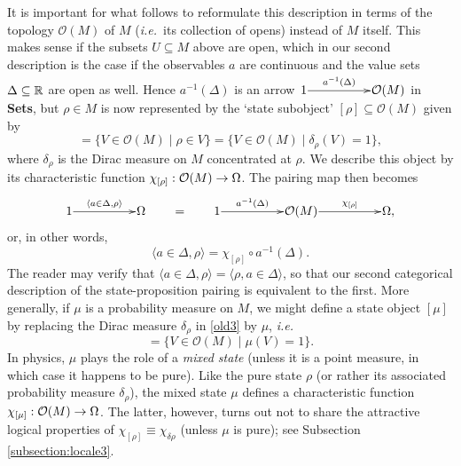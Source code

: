 \documentclass[12pt]{article}
\newcommand{\beq}{\begin{equation}}
\newcommand{\eeq}{\end{equation}}
\newcommand{\Sets}{\mbox{\textbf{Sets}}}
\newcommand{\raw}{\rightarrow} \newcommand{\rat}{\mapsto}
\newcommand{\inv}{^{-1}}
\newcommand{\er}{\eqref}
\newcommand{\dl}{\delta} \newcommand{\Dl}{\Delta}
\newcommand{\rh}{\rho} \newcommand{\sg}{\sigma}
\newcommand{\ch}{\chi} \newcommand{\ps}{\psi} \newcommand{\Ps}{\Psi}
\newcommand{\CO}{{\mathcal O}} \newcommand{\CP}{{\mathcal P}}
\newcommand{\ie}{\textit{i.e.}}
\begin{document}
It is important for what follows to reformulate this description in terms of
the topology $\CO(M)$ of $M$ (\ie\ its collection of opens) instead of $M$ itself.  This makes sense if the subsets $U\subseteq M$ above are open, which in our second description is the case if the observables $a$ are continuous and the value sets $\Dl\subseteq\R$ are open as well.  Hence $a\inv(\Dl)$ is an arrow
$\xymatrix@1{1\ar^-{a^{-1}(\Dl)}[rr] && \CO(M)}$ in \Sets, but $\rho\in M$ is now
represented by the `state subobject' \hbox{$[\rho]\subseteq\CO(M)$} given by
\beq
   [\rho]=\{V\in\CO(M)\mid \rho\in V\} =\{V\in\CO(M)\mid \dl_{\rho}(V)=1\},
   \label{old3}
\eeq
where $\dl_{\rho}$ is the Dirac measure on $M$ concentrated at $\rho$.
We describe this object by its characteristic function
$\ch_{[\rho]}:\CO(M)\raw\Om$. The pairing map then becomes
\beq
   \xymatrix@1{1\ar^-{\langle a\in \Dl,\rho \rangle}[rr]&&\Om}
   \qquad =\qquad
   \xymatrix@1{1\ar^-{a^{-1}(\Dl)}[rr] && \CO(M)
   \ar^-{\chi_{[\rho]}}[rr]&&\Om,} \label{spp}
\eeq
or, in other words,
\beq
\langle a\in \Dl,\rho \rangle=\chi_{[\rho]}\circ a^{-1}(\Dl).\label{circainv}\eeq
The reader may verify that $\langle a\in \Dl,\rho \rangle=\langle
\rho,a\in \Dl \rangle$, so that our second categorical description of the
state-proposition pairing is equivalent to the first. More generally, if $\mu$ is a probability measure on $M$, we might define a state object $[\mu]$ by replacing the Dirac measure $\dl_{\rh}$ in \er{old3} by $\mu$, \ie
\beq
   [\mu] =\{V\in\CO(M)\mid \mu(V)=1\}.
   \label{old3bis}
\eeq
In physics, $\mu$ plays the role of a {\it mixed state} (unless it is a point measure, in which case it happens to be pure). Like the pure state $\rh$ (or rather its associated probability measure
$\dl_{\rh}$), the mixed state $\mu$ defines a characteristic function $\ch_{[\mu]}:\CO(M)\raw\Om$. The latter, however, turns out
not to share the attractive logical properties of $\ch_{[\rh]}\equiv \ch_{\dl{\rh}}$ (unless $\mu$ is pure); see Subsection \ref{subsection:locale3}.
\end{document}

